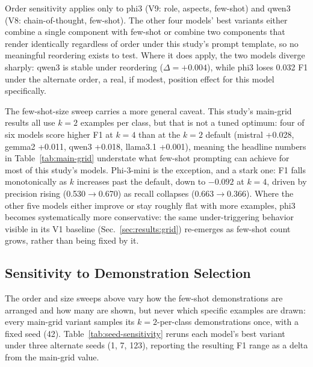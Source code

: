 Order sensitivity applies only to phi3 (V9: role, aspects, few-shot) and
qwen3 (V8: chain-of-thought, few-shot). The other four models' best
variants either combine a single component with few-shot or combine two
components that render identically regardless of order under this
study's prompt template, so no meaningful reordering exists to test.
Where it does apply, the two models diverge sharply: qwen3 is stable
under reordering ($\Delta=+0.004$), while phi3 loses 0.032 F1 under the
alternate order, a real, if modest, position effect for this model
specifically.

The few-shot-size sweep carries a more general caveat. This study's
main-grid results all use $k=2$ examples per class, but that is not a
tuned optimum: four of six models score higher F1 at $k=4$ than at the
$k=2$ default (mistral +0.028, gemma2 +0.011, qwen3 +0.018, llama3.1
+0.001), meaning the headline numbers in Table~\ref{tab:main-grid}
understate what few-shot prompting can achieve for most of this study's
models. Phi-3-mini is the exception, and a stark one: F1 falls
monotonically as $k$ increases past the default, down to $-0.092$ at
$k=4$, driven by precision rising (0.530$\to$0.670) as recall collapses
(0.663$\to$0.366). Where the other five models either improve or stay
roughly flat with more examples, phi3 becomes systematically more
conservative: the same under-triggering behavior visible in its V1
baseline (Sec.~\ref{sec:results:grid}) re-emerges as few-shot count
grows, rather than being fixed by it.

\subsection{Sensitivity to Demonstration Selection}
\label{sec:results:seed-sensitivity}

The order and size sweeps above vary how the few-shot demonstrations are
arranged and how many are shown, but never which specific examples are
drawn: every main-grid variant samples its $k{=}2$-per-class
demonstrations once, with a fixed seed (42). Table~\ref{tab:seed-sensitivity}
reruns each model's best variant under three alternate seeds (1, 7, 123),
reporting the resulting F1 range as a delta from the main-grid value.

